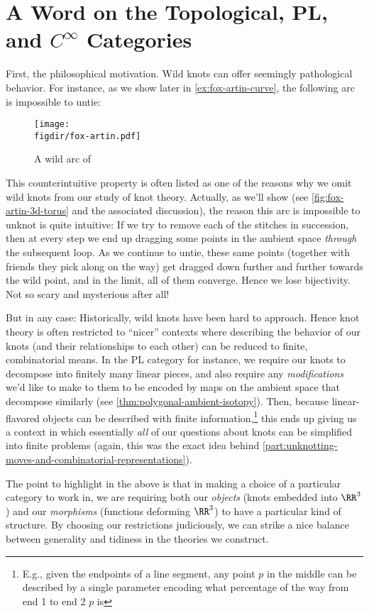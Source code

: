 \section{A Word on the Topological, PL, and $C^\infty$
  Categories}\label{sec:the-categories}
First, the philosophical motivation. Wild knots can offer seemingly
pathological behavior. For instance, as we show later in
\cref{ex:fox-artin-curve}, the following arc is impossible to untie:
\begin{figure}[H]
  \centering
  \texttt{[image: \\figdir/fox-artin.pdf]}
  \caption{A wild arc of \cite{FoxArtin}}
\end{figure}
This counterintuitive property is often listed as one of the reasons
why we omit wild knots from our study of knot theory. Actually, as
we'll show (see \cref{fig:fox-artin-3d-torus} and the associated
discussion), the reason this arc is impossible to unknot is quite
intuitive: If we try to remove each of the stitches in succession,
then at every step we end up dragging some points in the ambient space
\emph{through} the subsequent loop. As we continue to untie, these
same points (together with friends they pick along on the way) get
dragged down further and further towards the wild point, and in the
limit, all of them converge. Hence we lose bijectivity. Not so scary
and mysterious after all!

But in any case: Historically, wild knots have been hard to approach.
Hence knot theory is often restricted to ``nicer'' contexts where
describing the behavior of our knots (and their relationships to each
other) can be reduced to finite, combinatorial means. In the PL
category for instance, we require our knots to decompose into finitely
many linear pieces, and also require any \emph{modifications} we'd
like to make to them to be encoded by maps on the ambient space that
decompose similarly (see \cref{thm:polygonal-ambient-isotopy}). Then,
because linear-flavored objects can be described with finite
information,\footnote{E.g., given the endpoints of a line segment, any
  point $p$ in the middle can be described by a single parameter
  encoding what percentage of the way from end 1 to end 2 $p$ is} this
ends up giving us a context in which essentially \emph{all} of our
questions about knots can be simplified into finite problems (again,
this was the exact idea behind
\cref{part:unknotting-moves-and-combinatorial-representations}).

The point to highlight in the above is that in making a choice of a
particular category to work in, we are requiring both our
\emph{objects} (knots embedded into $\RR^3$) and our \emph{morphisms}
(functions deforming $\RR^3$) to have a particular kind of structure.
By choosing our restrictions judiciously, we can strike a nice balance
between generality and tidiness in the theories we construct.

